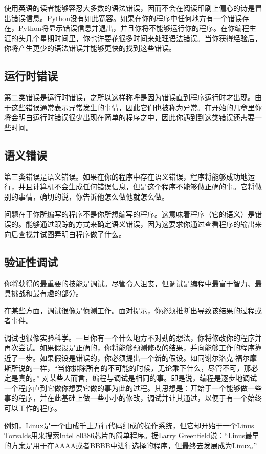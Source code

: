 使用英语的读者能够容忍大多数的语法错误，因而不会在阅读印刷上偏心的诗是冒出错误信息。Python没有如此宽容。如果在你的程序中任何地方有一个错误存在，Python将显示错误信息并退出，并且你将不能够运行你的程序。在你编程生涯的头几个星期时间里，你也许要花很多时间来处理语法错误。当你获得经验后，你将产生更少的语法错误并能够更快的找到这些错误。
\subsection{运行时错误}
第二类错误是运行时错误，之所以这样称呼是因为错误直到程序运行时才出现。由于这些错误通常表示异常发生的事情，因此它们也被称为异常。在开始的几章里你将会明白运行时错误很少出现在简单的程序之中，因此你遇到到这类错误还需要一些时间。
\subsection{语义错误}
第三类错误是语义错误。如果在你的程序中存在语义错误，程序将能够成功地运行，并且计算机不会生成任何错误信息，但是这个程序不能够做正确的事。它将做别的事情，确切的说，你告诉他怎么做他就怎么做。

问题在于你所编写的程序不是你所想编写的程序。这意味着程序（它的语义）是错误的。能够通过跟踪的方式来确定语义错误，因为这要求你通过查看程序的输出来向后查找并试图弄明白程序做了什么。

\subsection{验证性调试}
你将获得的最重要的技能是调试。尽管令人沮丧，但调试是编程中最富于智力、最具挑战和最有趣的部分。

在某些方面，调试很像是侦测工作。面对提示，你必须推断出导致该结果的过程或者事件。

调试也很像实验科学。一旦你有一个什么地方不对劲的想法，你将修改你的程序并再次尝试。如果假设是正确的，你将能够预测修改的结果，并向能够工作的程序靠近了一步。如果假设是错误的，你必须提出一个新的假设。如同谢尔洛克$\cdot$福尔摩斯所说的一样，“当你排除所有的不可能的时候，无论乘下什么，尽管不可，那必定是真的。”
对某些人而言，编程与调试是相同的事。即是说，编程是逐步地调试一个程序直到它做你想要它做的事为此的过程。其思想是：开始于一个能够做一些事的程序，并在此基础上做一些小小的修改，调试并让其通过，以便于有一个始终可以工作的程序。

例如，Linux是一个由成千上万行代码组成的操作系统，但它却开始于一个Linus Torvalds用来搜索Intel 80386芯片的简单程序。据Larry Greenfield说：“Linus最早的方案是用于在AAAA或者BBBB中进行选择的程序，但最终去发展成为Linux。”

